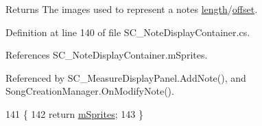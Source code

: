 \begin{DoxyReturn}{Returns}
The images used to represent a note\textquotesingle{}s \hyperlink{group___music_structs_ac35cd02f5b3c00e3040b51e40e9e6c94}{length}/\hyperlink{group___music_structs_ae281187907aed4c728c7981300dbebaf}{offset}. 
\end{DoxyReturn}


Definition at line 140 of file S\+C\+\_\+\+Note\+Display\+Container.\+cs.



References S\+C\+\_\+\+Note\+Display\+Container.\+m\+Sprites.



Referenced by S\+C\+\_\+\+Measure\+Display\+Panel.\+Add\+Note(), and Song\+Creation\+Manager.\+On\+Modify\+Note().


\begin{DoxyCode}
141     \{
142         \textcolor{keywordflow}{return} \hyperlink{group___s_c___n_d_c_priv_var_gac8df613ee0996e999278da2b3f523e34}{mSprites};
143     \}
\end{DoxyCode}
